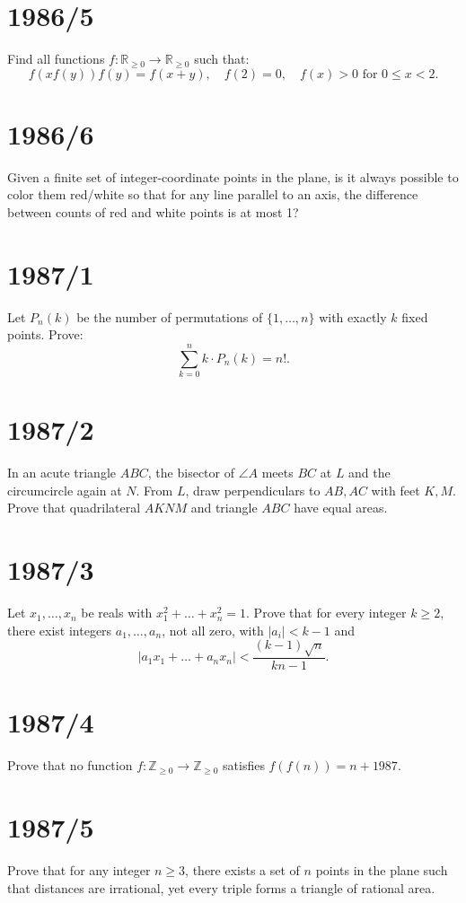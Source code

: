 \documentclass[12pt]{article}
\begin{document}
\section*{1986/5}
Find all functions \(f : \mathbb{R}_{\geq 0} \to \mathbb{R}_{\geq 0}\) such that:
\[
f(xf(y))f(y) = f(x+y), \quad f(2) = 0, \quad f(x) > 0 \text{ for } 0 \leq x < 2.
\]

\section*{1986/6}
Given a finite set of integer-coordinate points in the plane, is it always possible to color them red/white so that for any line parallel to an axis, the difference between counts of red and white points is at most 1?

\section*{1987/1}
Let \(P_n(k)\) be the number of permutations of \(\{1, \dots, n\}\) with exactly \(k\) fixed points. Prove:
\[
\sum_{k=0}^n k \cdot P_n(k) = n!.
\]

\section*{1987/2}
In an acute triangle \(ABC\), the bisector of \(\angle A\) meets \(BC\) at \(L\) and the circumcircle again at \(N\). From \(L\), draw perpendiculars to \(AB, AC\) with feet \(K, M\). Prove that quadrilateral \(AKNM\) and triangle \(ABC\) have equal areas.

\section*{1987/3}
Let \(x_1, \dots, x_n\) be reals with \(x_1^2 + \dots + x_n^2 = 1\). Prove that for every integer \(k \geq 2\), there exist integers \(a_1, \dots, a_n\), not all zero, with \(|a_i| < k-1\) and
\[
|a_1x_1 + \dots + a_nx_n| < \frac{(k-1)\sqrt{n}}{kn-1}.
\]

\section*{1987/4}
Prove that no function \(f : \mathbb{Z}_{\geq 0} \to \mathbb{Z}_{\geq 0}\) satisfies \(f(f(n)) = n + 1987\).

\section*{1987/5}
Prove that for any integer \(n \geq 3\), there exists a set of \(n\) points in the plane such that distances are irrational, yet every triple forms a triangle of rational area.
\end{document}
